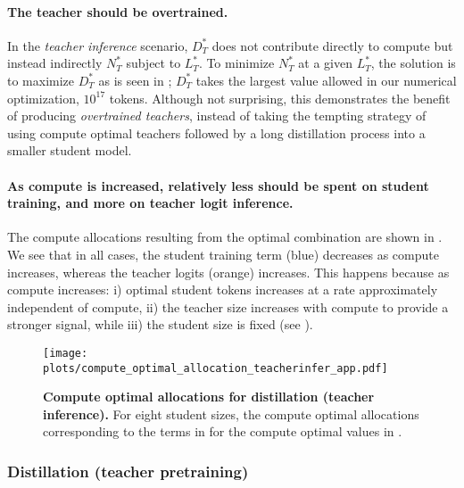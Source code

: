 \paragraph{The teacher should be overtrained.}
In the \emph{teacher inference} scenario, $D_T^*$ does not contribute directly to compute
but instead indirectly $N_T^*$ subject to $L_T^*$.
To minimize $N_T^*$ at a given $L_T^*$, the solution is to maximize $D_T^*$
as is seen in ; $D_T^*$ takes the largest value allowed in our numerical optimization, $10^{17}$ tokens.
Although not surprising, this demonstrates the benefit of producing \emph{overtrained teachers},
instead of taking the tempting strategy of using compute optimal teachers followed by a long distillation process into a smaller student model.

\paragraph{As compute is increased, relatively less should be spent on student training, and more on teacher logit inference.}
The compute allocations resulting from the optimal combination are shown in 
.
We see that in all cases, the student training term (blue) decreases as compute increases,
whereas the teacher logits (orange) increases.
This happens because as compute increases: i) optimal student tokens increases at a rate approximately independent of compute, ii) the teacher size increases with compute to provide a stronger signal, while iii) the student size is fixed (see ).

\begin{figure}[h]
	\centering
	\texttt{[image: plots/compute\_optimal\_allocation\_teacherinfer\_app.pdf]}
	\caption{\textbf{Compute optimal allocations for distillation (teacher inference).} For eight student sizes, the compute optimal allocations corresponding to the terms in  for the compute optimal values in .
	}
	\label{fig:compute-optimal-allocation-teacherinfer-app}
\end{figure}

\FloatBarrier
\subsubsection{Distillation (teacher pretraining)}
\label{sssec:distillation-teacher-pretraining}

